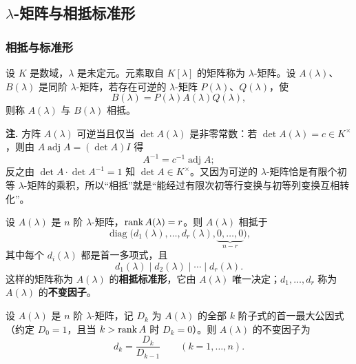 \subsection{\(\lambda\)-矩阵与相抵标准形}

\subsubsection{相抵与标准形}

\begin{definition}[矩阵的相抵]
设 \(K\) 是数域，\(\lambda\) 是未定元。元素取自 \(K[\lambda]\) 的矩阵称为 \(\lambda\)-矩阵。设 \(A(\lambda)\)、\(B(\lambda)\) 是同阶 \(\lambda\)-矩阵，若存在可逆的 \(\lambda\)-矩阵 \(P(\lambda)\)、\(Q(\lambda)\)，使
\[
B(\lambda)=P(\lambda)A(\lambda)Q(\lambda),
\]
则称 \(A(\lambda)\) 与 \(B(\lambda)\) 相抵。
\end{definition}

\noindent\textbf{注.} 方阵 \(A(\lambda)\) 可逆当且仅当 \(\det A(\lambda)\) 是非零常数：若 \(\det A(\lambda)=c\in K^\times\)，则由 \(A\operatorname{adj}A=(\det A)I\) 得
\[
A^{-1}=c^{-1}\operatorname{adj}A ;
\]
反之由 \(\det A\cdot\det A^{-1}=1\) 知 \(\det A\in K^\times\)。又因为可逆的 \(\lambda\)-矩阵恰是有限个初等 \(\lambda\)-矩阵的乘积，所以“相抵”就是“能经过有限次初等行变换与初等列变换互相转化”。

\begin{theorem}[相抵标准形]
设 \(A(\lambda)\) 是 \(n\) 阶 \(\lambda\)-矩阵，\(\operatorname{rank} A(\lambda)=r\)。则 \(A(\lambda)\) 相抵于
\[
\operatorname{diag}\bigl(d_1(\lambda),\dots,d_r(\lambda),\underbrace{0,\dots,0}_{n-r}\bigr),
\]
其中每个 \(d_i(\lambda)\) 都是首一多项式，且
\[
d_1(\lambda)\mid d_2(\lambda)\mid\cdots\mid d_r(\lambda).
\]
这样的矩阵称为 \(A(\lambda)\) 的\textbf{相抵标准形}，它由 \(A(\lambda)\) 唯一决定；\(d_1,\dots,d_r\) 称为 \(A(\lambda)\) 的\textbf{不变因子}。
\end{theorem}

\begin{proposition}[不变因子的计算]
设 \(A(\lambda)\) 是 \(n\) 阶 \(\lambda\)-矩阵，记 \(D_k\) 为 \(A(\lambda)\) 的全部 \(k\) 阶子式的首一最大公因式（约定 \(D_0=1\)，且当 \(k>\operatorname{rank} A\) 时 \(D_k=0\)）。则 \(A(\lambda)\) 的不变因子为
\[
d_k=\frac{D_k}{D_{k-1}}\qquad(k=1,\dots,n).
\]
\end{proposition}

